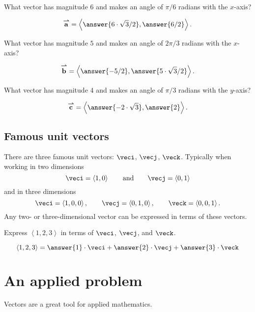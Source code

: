 \documentclass{ximera}
\renewcommand{\vec}[1]{{\overset{\boldsymbol{\rightharpoonup}}{\mathbf{#1}}}}
\renewcommand{\vector}[1]{\left\langle #1\right\rangle}
\begin{document}
\begin{question}
  What vector has magnitude $6$ and makes an angle of $\pi/6$ radians with the $x$-axis?
  \begin{prompt}
    \[
    \vec{a} = \vector{\answer{6\cdot \sqrt{3}/2},\answer{6/2}}.
    \]
  \end{prompt}
  \begin{question}
  What vector has magnitude $5$ and makes an angle of $2\pi/3$ radians with the $x$-axis?
  \begin{prompt}
    \[
    \vec{b} = \vector{\answer{-5/2},\answer{5\cdot \sqrt{3}/2}}.
    \]
  \end{prompt}
  \begin{question}
  What vector has magnitude $4$ and makes an angle of $\pi/3$ radians with the $y$-axis?
  \begin{prompt}
    \[
    \vec{c} = \vector{\answer{-2\cdot \sqrt{3}},\answer{2}}.
    \]
  \end{prompt}
  \end{question}
\end{question}
\end{question}

\subsection{Famous unit vectors}

There are three famous unit vectors: $\veci$, $\vecj$,
$\veck$. Typically when working in two dimensions
\[
\veci=\vector{1,0}\qquad\text{and}\qquad\vecj=\vector{0,1}
\]
and in three dimensions
\[
\veci=\vector{1,0,0},\qquad \vecj=\vector{0,1,0}, \qquad\veck=\vector{0,0,1}.
\]
Any two- or three-dimensional vector can be expressed in terms of these
vectors.

\begin{question}
  Express $\vector{1,2,3}$ in terms of $\veci$, $\vecj$, and $\veck$.
  \begin{prompt}
    \[
    \vector{1,2,3} = \answer{1}\cdot \veci + \answer{2}\cdot\vecj + \answer{3}\cdot\veck
    \]
  \end{prompt}
\end{question}



\section{An applied problem}

Vectors are a great tool for applied mathematics.
\end{document}
